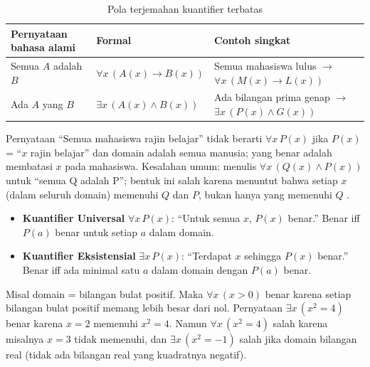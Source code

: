 \begin{table}[htbp]
\centering
\small
\begin{tabular}{|>{\raggedright\arraybackslash}p{3.2cm}|l|>{\raggedright\arraybackslash}p{4cm}|}
\hline
\textbf{Pernyataan bahasa alami} & \textbf{Formal} & \textbf{Contoh singkat} \\
\hline
Semua $A$ adalah $B$ & $\forall x \, (A(x) \rightarrow B(x))$ & Semua mahasiswa lulus $\rightarrow$ $\forall x \, (M(x) \to L(x))$ \\
\hline
Ada $A$ yang $B$ & $\exists x \, (A(x) \wedge B(x))$ & Ada bilangan prima genap $\rightarrow$ $\exists x \, (P(x) \wedge G(x))$ \\
\hline
\end{tabular}
\caption{Pola terjemahan kuantifier terbatas \cite{forallx,copi2014}}
\label{tab:pola-terjemahan}
\end{table}

Pernyataan ``Semua mahasiswa rajin belajar'' tidak berarti $\forall x \, P(x)$ jika $P(x)$ = ``$x$ rajin belajar'' dan domain adalah semua manusia; yang benar adalah membatasi $x$ pada mahasiswa. Kesalahan umum: menulis $\forall x \, (Q(x) \wedge P(x))$ untuk ``semua Q adalah P''; bentuk ini salah karena menuntut bahwa setiap $x$ (dalam seluruh domain) memenuhi $Q$ dan $P$, bukan hanya yang memenuhi $Q$ \cite{forallx,copi2014}.

\begin{itemize}
  \item \textbf{Kuantifier Universal} $\forall x \, P(x)$: ``Untuk semua $x$, $P(x)$ benar.'' Benar iff $P(a)$ benar untuk setiap $a$ dalam domain.
  \item \textbf{Kuantifier Eksistensial} $\exists x \, P(x)$: ``Terdapat $x$ sehingga $P(x)$ benar.'' Benar iff ada minimal satu $a$ dalam domain dengan $P(a)$ benar.
\end{itemize}

\begin{contoh}
Misal domain = bilangan bulat positif. Maka $\forall x \, (x > 0)$ benar karena setiap bilangan bulat positif memang lebih besar dari nol. Pernyataan $\exists x \, (x^2 = 4)$ benar karena $x = 2$ memenuhi $x^2 = 4$. Namun $\forall x \, (x^2 = 4)$ salah karena misalnya $x = 3$ tidak memenuhi, dan $\exists x \, (x^2 = -1)$ salah jika domain bilangan real (tidak ada bilangan real yang kuadratnya negatif).
\end{contoh}

